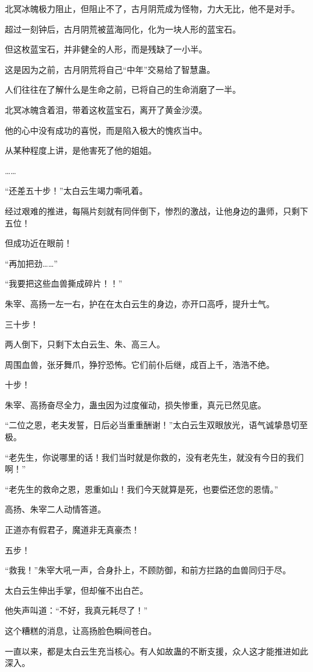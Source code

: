 \begin{this_body}
北冥冰魄极力阻止，但阻止不了，古月阴荒成为怪物，力大无比，他不是对手。

超过一刻钟后，古月阴荒被蓝海同化，化为一块人形的蓝宝石。

但这枚蓝宝石，并非健全的人形，而是残缺了一小半。

这是因为之前，古月阴荒将自己“中年”交易给了智慧蛊。

人们往往在了解什么是生命之前，已将自己的生命消磨了一半。

北冥冰魄含着泪，带着这枚蓝宝石，离开了黄金沙漠。

他的心中没有成功的喜悦，而是陷入极大的愧疚当中。

从某种程度上讲，是他害死了他的姐姐。

……

“还差五十步！”太白云生竭力嘶吼着。

经过艰难的推进，每隔片刻就有同伴倒下，惨烈的激战，让他身边的蛊师，只剩下五位！

但成功近在眼前！

“再加把劲……”

“我要把这些血兽撕成碎片！！”

朱宰、高扬一左一右，护在在太白云生的身边，亦开口高呼，提升士气。

三十步！

两人倒下，只剩下太白云生、朱、高三人。

周围血兽，张牙舞爪，狰狞恐怖。它们前仆后继，成百上千，浩浩不绝。

十步！

朱宰、高扬奋尽全力，蛊虫因为过度催动，损失惨重，真元已然见底。

“二位之恩，老夫发誓，日后必当重重酬谢！”太白云生双眼放光，语气诚挚恳切至极。

“老先生，你说哪里的话！我们当时就是你救的，没有老先生，就没有今日的我们啊！”

“老先生的救命之恩，恩重如山！我们今天就算是死，也要偿还您的恩情。”

高扬、朱宰二人动情答道。

正道亦有假君子，魔道非无真豪杰！

五步！

“救我！”朱宰大吼一声，合身扑上，不顾防御，和前方拦路的血兽同归于尽。

太白云生伸出手掌，但却催不出白芒。

他失声叫道：“不好，我真元耗尽了！”

这个糟糕的消息，让高扬脸色瞬间苍白。

一直以来，都是太白云生充当核心。有人如故蛊的不断支援，众人这才能推进如此深入。


\end{this_body}
